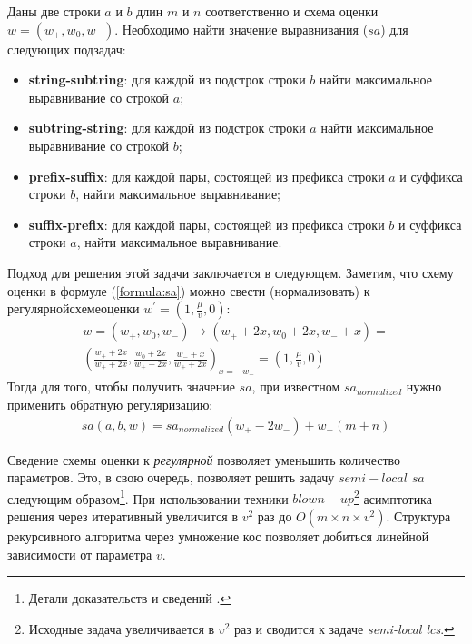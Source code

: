 Даны две строки $a$ и $b$ длин $m$ и $n$ соответственно и схема оценки $w = (w_{+}, w_{0} , w_{-})$. 
Необходимо найти значение выравнивания ($sa$) для следующих подзадач:
\begin{itemize}
    \item \textbf{string-subtring}: для каждой из подстрок строки $b$ найти максимальное выравнивание со строкой $a$; 
    \item \textbf{subtring-string}: для каждой из подстрок строки $a$ найти максимальное выравнивание со строкой $b$; 
    \item \textbf{prefix-suffix}: для каждой пары, состоящей из префикса строки $a$ и суффикса строки $b$, найти максимальное выравнивание; 
    \item \textbf{suffix-prefix}: для каждой пары, состоящей из префикса строки $b$ и суффикса строки $a$, найти максимальное выравнивание. 
\end{itemize}
Подход для решения этой задачи заключается в следующем.
Заметим, что  схему оценки в  формуле (\ref{formula:sa}) можно свести (нормализовать) к $регулярной схеме оценки$ $w^{'} = (1,\frac{\mu}{v} ,0)$:
\begin{equation}\label{weightNormalization}
    \begin{aligned}
    w = (w_{+}, w_{0} , w_{-}) \xrightarrow{} (w_{+} +2x , w_{0} + 2x , w_{-} + x) =\\ ( \frac{w_{+} +2x}{w_{+} +2x} , \frac {w_{0} + 2x}{w_{+} +2x} , \frac{w_{-} + x}{w_{+} +2x})_{x=-w_{-}} = (1,\frac{\mu}{v} ,0) 
    \end{aligned}
\end{equation}
Тогда для того, чтобы получить значение $sa$, при  известном $sa_{normalized}$ нужно применить обратную регуляризацию:
\begin{equation}
    \begin{aligned}
    sa(a,b,w) = sa_{normalized}  (w_{+} - 2w_{-}) +  w_{-} (m + n)
    \end{aligned}
\end{equation}

Сведение схемы оценки к \emph{регулярной} позволяет уменьшить количество параметров.
Это, в свою очередь, позволяет решить задачу $semi-local$ $sa$ следующим образом\footnote{Детали доказательств и сведений  \cite{tiskin2006all}.}. 
При использовании техники $blown-up$\footnote{Исходные задача увеличивается в $v^2$ раз и сводится к задаче \emph{semi-local lcs}.} асимптотика решения через  итеративный увеличится в $v^2$ раз до $O(m \times n \times v^2)$.
Структура рекурсивного алгоритма через умножение кос позволяет добиться линейной зависимости от параметра $v$. 

